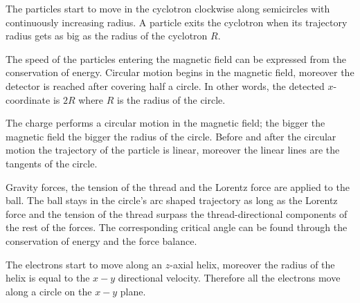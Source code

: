 \documentclass[11pt]{article}
\begin{document}

\hinteng
The particles start to move in the cyclotron clockwise along semicircles with continuously increasing radius. A particle exits the cyclotron when its trajectory radius gets as big as the radius of the cyclotron $R$.
\probend
\bigskip


\hinteng
The speed of the particles entering the magnetic field can be expressed from the conservation of energy. Circular motion begins in the magnetic field, moreover the detector is reached after covering half a circle. In other words, the detected $x$-coordinate is $2R$ where $R$ is the radius of the circle.
\probend
\bigskip


\hinteng
The charge performs a circular motion in the magnetic field; the bigger the magnetic field the bigger the radius of the circle. Before and after the circular motion the trajectory of the particle is linear, moreover the linear lines are the tangents of the circle.
\probend
\bigskip


\hinteng
Gravity forces, the tension of the thread and the Lorentz force are applied to the ball. The ball stays in the circle’s arc shaped trajectory as long as the Lorentz force and the tension of the thread surpass the thread-directional components of the rest of the forces. The corresponding critical angle can be found through the conservation of energy and the force balance.
\probend
\bigskip


\hinteng
The electrons start to move along an $z$-axial helix, moreover the radius of the helix is equal to the $x-y$ directional velocity. Therefore all the electrons move along a circle on the $x-y$ plane.
\probend
\bigskip
\end{document}
